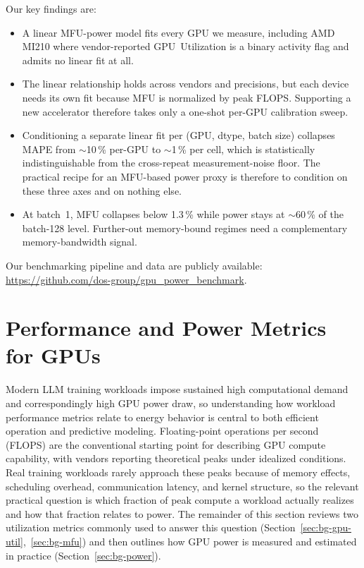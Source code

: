 \documentclass[10pt,conference,letterpaper]{IEEEtran}
\begin{document}
Our key findings are:
\begin{itemize}
    \item A linear MFU-power model fits every GPU we measure, including AMD MI210 where vendor-reported GPU~Utilization is a binary activity flag and admits no linear fit at all.
    \item The linear relationship holds across vendors and precisions, but each device needs its own fit because MFU is normalized by peak FLOPS. Supporting a new accelerator therefore takes only a one-shot per-GPU calibration sweep.
    \item Conditioning a separate linear fit per (GPU, dtype, batch size) collapses MAPE from $\sim$10\,\% per-GPU to $\sim$1\,\% per cell, which is statistically indistinguishable from the cross-repeat measurement-noise floor. The practical recipe for an MFU-based power proxy is therefore to condition on these three axes and on nothing else.
    \item At batch~1, MFU collapses below 1.3\,\% while power stays at $\sim$60\,\% of the batch-128 level. Further-out memory-bound regimes need a complementary memory-bandwidth signal.
\end{itemize}

Our benchmarking pipeline and data are publicly available: \url{https://github.com/dos-group/gpu_power_benchmark}.


\section{Performance and Power Metrics for GPUs}\label{Background}
Modern LLM training workloads impose sustained high computational demand and correspondingly high GPU power draw, so understanding how workload performance metrics relate to energy behavior is central to both efficient operation and predictive modeling.
Floating-point operations per second (FLOPS) are the conventional starting point for describing GPU compute capability, with vendors reporting theoretical peaks under idealized conditions.
Real training workloads rarely approach these peaks because of memory effects, scheduling overhead, communication latency, and kernel structure, so the relevant practical question is which fraction of peak compute a workload actually realizes and how that fraction relates to power.
The remainder of this section reviews two utilization metrics commonly used to answer this question (Section~\ref{sec:bg-gpu-util},~\ref{sec:bg-mfu}) and then outlines how GPU power is measured and estimated in practice (Section~\ref{sec:bg-power}).
\end{document}
